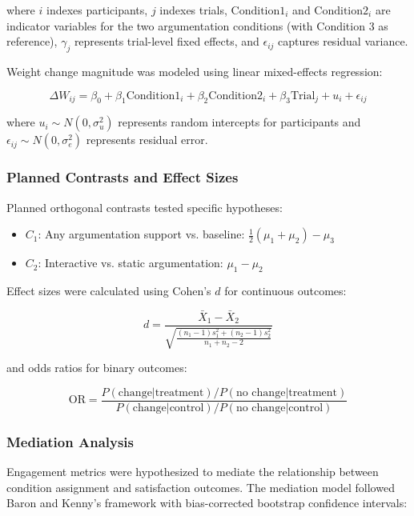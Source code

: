 \documentclass[conference]{IEEEtran}
\begin{document}
where $i$ indexes participants, $j$ indexes trials, $\text{Condition1}_i$ and $\text{Condition2}_i$ are indicator variables for the two argumentation conditions (with Condition 3 as reference), $\gamma_j$ represents trial-level fixed effects, and $\epsilon_{ij}$ captures residual variance.

Weight change magnitude was modeled using linear mixed-effects regression:

\begin{equation}
\Delta W_{ij} = \beta_0 + \beta_1 \text{Condition1}_i + \beta_2 \text{Condition2}_i + \beta_3 \text{Trial}_j + u_i + \epsilon_{ij}
\end{equation}

where $u_i \sim N(0, \sigma_u^2)$ represents random intercepts for participants and $\epsilon_{ij} \sim N(0, \sigma_e^2)$ represents residual error.

\subsubsection{Planned Contrasts and Effect Sizes}

Planned orthogonal contrasts tested specific hypotheses:
\begin{itemize}
\item $C_1$: Any argumentation support vs. baseline: $\frac{1}{2}(\mu_1 + \mu_2) - \mu_3$
\item $C_2$: Interactive vs. static argumentation: $\mu_1 - \mu_2$
\end{itemize}

Effect sizes were calculated using Cohen's $d$ for continuous outcomes:

\begin{equation}
d = \frac{\bar{X}_1 - \bar{X}_2}{\sqrt{\frac{(n_1-1)s_1^2 + (n_2-1)s_2^2}{n_1+n_2-2}}}
\end{equation}

and odds ratios for binary outcomes:

\begin{equation}
\text{OR} = \frac{P(\text{change}|\text{treatment})/P(\text{no change}|\text{treatment})}{P(\text{change}|\text{control})/P(\text{no change}|\text{control})}
\end{equation}

\subsubsection{Mediation Analysis}

Engagement metrics were hypothesized to mediate the relationship between condition assignment and satisfaction outcomes. The mediation model followed Baron and Kenny's framework with bias-corrected bootstrap confidence intervals:
\end{document}
